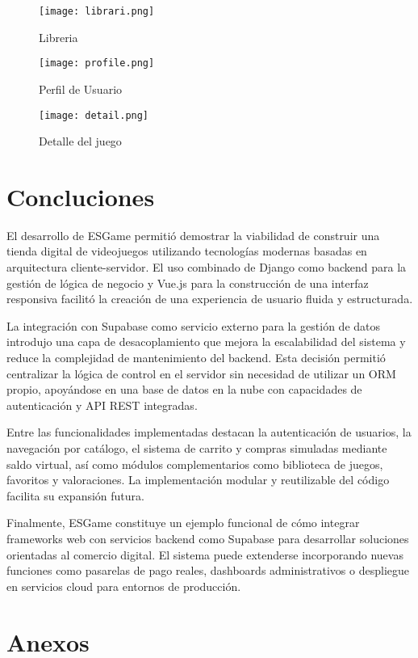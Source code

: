 \documentclass[conference]{IEEEtran}
\begin{document}
\begin{figure}[htbp]
	\centerline{\texttt{[image: librari.png]}}
	\caption{Libreria}
	\label{fig}
\end{figure}

\begin{figure}[htbp]
	\centerline{\texttt{[image: profile.png]}}
	\caption{Perfil de Usuario}
	\label{fig}
\end{figure}

\begin{figure}[htbp]
	\centerline{\texttt{[image: detail.png]}}
	\caption{Detalle del juego}
	\label{fig}
\end{figure}

\section{Concluciones}
El desarrollo de ESGame permitió demostrar la viabilidad de construir una tienda digital de videojuegos utilizando tecnologías modernas basadas en arquitectura cliente-servidor. El uso combinado de Django como backend para la gestión de lógica de negocio y Vue.js para la construcción de una interfaz responsiva facilitó la creación de una experiencia de usuario fluida y estructurada.

La integración con Supabase como servicio externo para la gestión de datos introdujo una capa de desacoplamiento que mejora la escalabilidad del sistema y reduce la complejidad de mantenimiento del backend. Esta decisión permitió centralizar la lógica de control en el servidor sin necesidad de utilizar un ORM propio, apoyándose en una base de datos en la nube con capacidades de autenticación y API REST integradas.

Entre las funcionalidades implementadas destacan la autenticación de usuarios, la navegación por catálogo, el sistema de carrito y compras simuladas mediante saldo virtual, así como módulos complementarios como biblioteca de juegos, favoritos y valoraciones. La implementación modular y reutilizable del código facilita su expansión futura.

Finalmente, ESGame constituye un ejemplo funcional de cómo integrar frameworks web con servicios backend como Supabase para desarrollar soluciones orientadas al comercio digital. El sistema puede extenderse incorporando nuevas funciones como pasarelas de pago reales, dashboards administrativos o despliegue en servicios cloud para entornos de producción.

\section*{Anexos}
\end{document}
